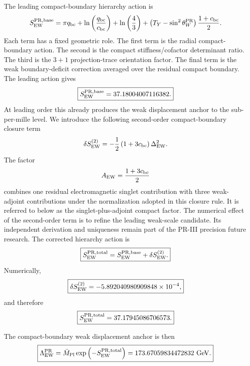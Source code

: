 \documentclass[11pt]{article}
\begin{document}
The leading compact-boundary hierarchy action is
\begin{equation}
S_{\rm EW}^{\rm PR,base}
=
\pi q_{\rm bc}
+
\ln
\left(
\frac{q_{\rm bc}}{c_{\rm bc}}
\right)
+
\ln
\left(
\frac43
\right)
+
\left(
T_Y-\sin^2\theta_W^{\rm PR}
\right)
\frac{1+c_{\rm bc}}{2}.
\end{equation}
Each term has a fixed geometric role. 
The first term is the radial compact-boundary action. 
The second is the compact stiffness/cofactor determinant ratio. 
The third is the \(3+1\) projection-trace orientation factor. 
The final term is the weak boundary-deficit correction averaged over the residual compact boundary. The leading action gives
\begin{equation}
\boxed{
S_{\rm EW}^{\rm PR,base}
=
37.18004007116382.
}
\end{equation}
At leading order this already produces the weak displacement anchor to the sub-per-mille level. 
We introduce the following second-order compact-boundary closure term 
\begin{equation}
\delta S_{\rm EW}^{(2)}
=
-\frac12
\left(
1+3c_{\rm bc}
\right)
\Delta_{\rm EW}^2.
\end{equation}
The factor
\begin{equation}
A_{\rm EW}
=
\frac{1+3c_{\rm bc}}{2}
\end{equation}
combines one residual electromagnetic singlet contribution with three weak-adjoint contributions under the normalization adopted in this closure rule. It is referred to below as the singlet-plus-adjoint compact factor. The numerical effect of the second-order term is to refine the leading weak-scale candidate. Its independent derivation and
uniqueness remain part of the PR-III precision future research. The corrected hierarchy action is
\begin{equation}
\boxed{
S_{\rm EW}^{\rm PR,total}
=
S_{\rm EW}^{\rm PR,base}
+
\delta S_{\rm EW}^{(2)}.
}
\end{equation}
Numerically,
\begin{equation}
\boxed{
\delta S_{\rm EW}^{(2)}
=
-5.892040980909848\times10^{-4},
}
\end{equation}
and therefore
\begin{equation}
\boxed{
S_{\rm EW}^{\rm PR,total}
=
37.17945086706573.
}
\end{equation}

The compact-boundary weak displacement anchor is then
\begin{equation}
\boxed{
\Lambda_{\rm EW}^{\rm PR}
=
\bar M_{\rm Pl}
\exp
\left(
-S_{\rm EW}^{\rm PR,total}
\right)
=
173.67059834472832\ {\rm GeV}.
}
\end{equation}
\end{document}
